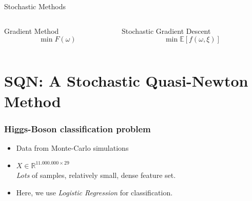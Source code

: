 \documentclass[10pt]{beamer}
\begin{document}
  \begin{frame}{Stochastic Methods}
    \begin{columns}[T]
      \begin{column}{.5\textwidth}
        \centering \alert{Gradient Method}
        $$\min F(\omega) $$

      \end{column}\hfill
      \begin{column}{.5\textwidth}
        \centering \alert{Stochastic Gradient Descent}
        $$\min \mathbb E \left [f(\omega, \xi)\right]$$
      \end{column}
    \end{columns}
  \end{frame}

\section{SQN: A Stochastic Quasi-Newton Method}

  \begin{frame}
    \frametitle{Higgs-Boson classification problem}
      \begin{itemize}
        \item Data from Monte-Carlo simulations
        \item $X\in \mathbb R^{11.000.000 \times 29}$\\\emph{Lots} of samples, relatively small, dense feature set.
        \item Here, we use \emph{Logistic Regression} for classification.
      \end{itemize}
  \end{frame}
\end{document}
